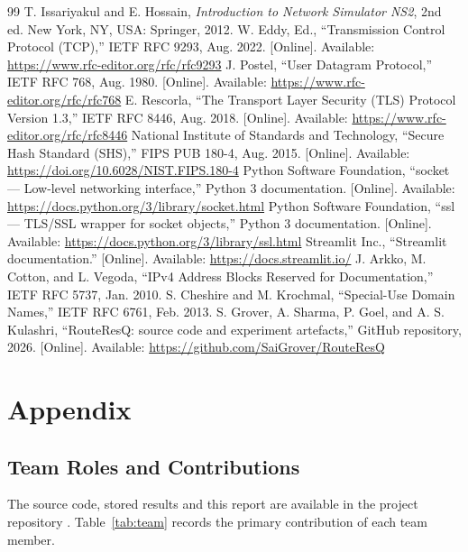 \documentclass[12pt,a4paper]{report}
\numberwithin{equation}{chapter}
\begin{document}
\clearpage
\renewcommand{\bibname}{References}
\begin{thebibliography}{99}
 T. Issariyakul and E. Hossain, \emph{Introduction to Network Simulator NS2}, 2nd ed. New York, NY, USA: Springer, 2012.
 W. Eddy, Ed., ``Transmission Control Protocol (TCP),'' IETF RFC 9293, Aug. 2022. [Online]. Available: \url{https://www.rfc-editor.org/rfc/rfc9293}
 J. Postel, ``User Datagram Protocol,'' IETF RFC 768, Aug. 1980. [Online]. Available: \url{https://www.rfc-editor.org/rfc/rfc768}
 E. Rescorla, ``The Transport Layer Security (TLS) Protocol Version 1.3,'' IETF RFC 8446, Aug. 2018. [Online]. Available: \url{https://www.rfc-editor.org/rfc/rfc8446}
 National Institute of Standards and Technology, ``Secure Hash Standard (SHS),'' FIPS PUB 180-4, Aug. 2015. [Online]. Available: \url{https://doi.org/10.6028/NIST.FIPS.180-4}
 Python Software Foundation, ``socket --- Low-level networking interface,'' Python 3 documentation. [Online]. Available: \url{https://docs.python.org/3/library/socket.html}
 Python Software Foundation, ``ssl --- TLS/SSL wrapper for socket objects,'' Python 3 documentation. [Online]. Available: \url{https://docs.python.org/3/library/ssl.html}
 Streamlit Inc., ``Streamlit documentation.'' [Online]. Available: \url{https://docs.streamlit.io/}
 J. Arkko, M. Cotton, and L. Vegoda, ``IPv4 Address Blocks Reserved for Documentation,'' IETF RFC 5737, Jan. 2010.
 S. Cheshire and M. Krochmal, ``Special-Use Domain Names,'' IETF RFC 6761, Feb. 2013.
 S. Grover, A. Sharma, P. Goel, and A. S. Kulashri, ``RouteResQ: source code and experiment artefacts,'' GitHub repository, 2026. [Online]. Available: \url{https://github.com/SaiGrover/RouteResQ}
\end{thebibliography}

\clearpage
\chapter*{Appendix}
\setcounter{table}{0}
\renewcommand{\thetable}{A.\arabic{table}}
\section*{Team Roles and Contributions}
The source code, stored results and this report are available in the project repository \cite{repo}. Table~\ref{tab:team} records the primary contribution of each team member.
\end{document}
